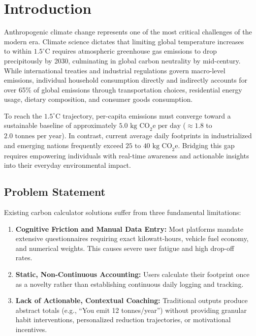 \documentclass[12pt,a4paper]{article}
\begin{document}
\section{Introduction}
Anthropogenic climate change represents one of the most critical challenges of the modern era. Climate science dictates that limiting global temperature increases to within $1.5^\circ\text{C}$ requires atmospheric greenhouse gas emissions to drop precipitously by 2030, culminating in global carbon neutrality by mid-century. While international treaties and industrial regulations govern macro-level emissions, individual household consumption directly and indirectly accounts for over 65\% of global emissions through transportation choices, residential energy usage, dietary composition, and consumer goods consumption.

To reach the $1.5^\circ\text{C}$ trajectory, per-capita emissions must converge toward a sustainable baseline of approximately $5.0\text{ kg CO}_2\text{e per day}$ ($\approx 1.8$ to $2.0\text{ tonnes per year}$). In contrast, current average daily footprints in industrialized and emerging nations frequently exceed $25\text{ to }40\text{ kg CO}_2\text{e}$. Bridging this gap requires empowering individuals with real-time awareness and actionable insights into their everyday environmental impact.

\subsection{Problem Statement}
Existing carbon calculator solutions suffer from three fundamental limitations:
\begin{enumerate}
    \item \textbf{Cognitive Friction and Manual Data Entry:} Most platforms mandate extensive questionnaires requiring exact kilowatt-hours, vehicle fuel economy, and numerical weights. This causes severe user fatigue and high drop-off rates.
    \item \textbf{Static, Non-Continuous Accounting:} Users calculate their footprint once as a novelty rather than establishing continuous daily logging and tracking.
    \item \textbf{Lack of Actionable, Contextual Coaching:} Traditional outputs produce abstract totals (e.g., ``You emit 12 tonnes/year'') without providing granular habit interventions, personalized reduction trajectories, or motivational incentives.
\end{enumerate}
\end{document}

